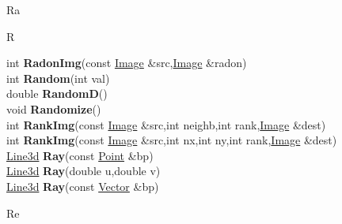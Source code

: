 \documentclass[10pt,titlepage]{article}
\def\functionlistentry#1#2#3#4#5#6{\noindent #1 {\bf #2}(#3) \dotfill #6\\}
\def\letterref#1{}
\def\letterlabel#1{\vspace{0.5cm}\centerline{\Large #1}}
\def\letterlabelend#1{}
\begin{document}
{{\letterlabel{Ra}
\letterlabel{R}
\letterref{A}
\letterref{B}
\letterref{C}
\letterref{D}
\letterref{E}
\letterref{F}
\letterref{G}
\letterref{H}
\letterref{I}
\letterref{K}
\letterref{L}
\letterref{M}
\letterref{N}
\letterref{O}
\letterref{P}
\letterref{Q}
\letterref{R}
\letterref{S}
\letterref{T}
\letterref{U}
\letterref{V}
\letterref{W}
\letterref{X}
\letterref{Y}
\letterref{Z}

\letterref{Ra}
\letterref{Re}
\letterref{Rg}
\letterref{Ri}
\letterref{Ro}
\letterlabelend{Ra}
\functionlistentry{int}{RadonImg}{const \hyperlink{Image}{Image} \&src,\hyperlink{Image}{Image} \&radon}{1231}{signalTrafo}{}
\functionlistentry{int}{Random}{int val}{860}{statistics}{}
\functionlistentry{double}{RandomD}{}{861}{statistics}{}
\functionlistentry{void}{Randomize}{}{859}{statistics}{}
\functionlistentry{int}{RankImg}{const \hyperlink{Image}{Image} \&src,int neighb,int rank,\hyperlink{Image}{Image} \&dest}{384}{filter}{}
\functionlistentry{int}{RankImg}{const \hyperlink{Image}{Image} \&src,int nx,int ny,int rank,\hyperlink{Image}{Image} \&dest}{385}{filter}{}
\functionlistentry{\hyperlink{Line3d}{Line3d}}{Ray}{const \hyperlink{Point}{Point} \&bp}{788}{cameraModel}{}
\functionlistentry{\hyperlink{Line3d}{Line3d}}{Ray}{double u,double v}{789}{cameraModel}{}
\functionlistentry{\hyperlink{Line3d}{Line3d}}{Ray}{const \hyperlink{Vector}{Vector} \&bp}{790}{cameraModel}{}

\letterlabel{Re}
\letterref{A}
\letterref{B}
\letterref{C}
\letterref{D}
\letterref{E}
\letterref{F}
\letterref{G}
\letterref{H}
\letterref{I}
\letterref{K}
\letterref{L}
\letterref{M}
\letterref{N}
\letterref{O}
\letterref{P}
\letterref{Q}
\letterref{R}
\letterref{S}
\letterref{T}
\letterref{U}
\letterref{V}
\letterref{W}
\letterref{X}
\letterref{Y}
\letterref{Z}

}}
\end{document}
